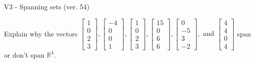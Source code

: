 \begin{exercise}
  \begin{exerciseTitle}V3 - Spanning sets (ver. 54)\end{exerciseTitle}
  \begin{exerciseStatement}
    Explain why the vectors \(\left[\begin{array}{r}
1 \\
0 \\
2 \\
3
\end{array}\right] , \left[\begin{array}{r}
-4 \\
0 \\
0 \\
1
\end{array}\right] , \left[\begin{array}{r}
1 \\
0 \\
2 \\
3
\end{array}\right] , \left[\begin{array}{r}
15 \\
0 \\
6 \\
6
\end{array}\right] , \left[\begin{array}{r}
0 \\
-5 \\
3 \\
-2
\end{array}\right] , \text{ and } \left[\begin{array}{r}
4 \\
4 \\
0 \\
4
\end{array}\right]\) span or don't span \(\mathbb{R}^4\). 
	



\end{exerciseStatement}
\end{exercise}
